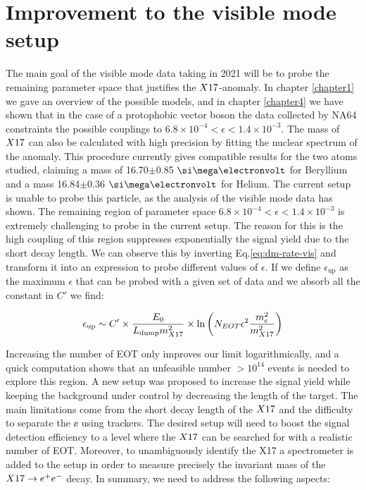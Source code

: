 \section{Improvement to the visible mode setup}
\label{ch5:sec:new-vismode-setup}

The main goal of the visible mode data taking in 2021 will be to probe the remaining parameter space that justifies the $X17$-anomaly. In chapter \ref{chapter1} we gave an overview of the possible models, and in chapter \ref{chapter4} we have shown that in the case of a protophobic vector boson the data collected by NA64 constraints the possible couplings to $6.8 \times 10^{-4} < \epsilon < 1.4 \times 10^{-3}$. The mass of $X17$ can also be calculated with high precision by fitting the nuclear spectrum of the anomaly. This procedure currently gives compatible results for the two atoms studied, claiming a mass of 16.70$\pm$0.85 $\mev$ for Beryllium and a mass 16.84$\pm$0.36 $\mev$ for Helium. The current setup is unable to probe this particle, as the analysis of the visible mode data has shown. The remaining region of parameter space $6.8 \times 10^{-4} < \epsilon < 1.4 \times 10^{-3}$ is extremely challenging to probe in the current setup. The reason for this is the high coupling of this region suppresses exponentially the signal yield due to the short decay length. We can observe this by inverting Eq.\ref{eq:dm-rate-vis} and transform it into an expression to probe different values of $\epsilon$. If we define $\epsilon_{\textrm{up}}$ as the maximum $\epsilon$ that can be probed with a given set of data and we absorb all the constant in $C'$ we find:

\begin{equation}
  \label{eq:x17-coverage}
  \epsilon_{\textrm{up}} \sim C' \times \frac{E_0}{L_{\textrm{dump}}m^2_{X17}} \times \ln{\left(N_{EOT} \epsilon^2 \frac{m_e^2}{m_{X17}^2}\right)}
\end{equation}

Increasing the number of EOT only improves our limit logarithmically, and a quick computation shows that an unfeasible number $>10^{14}$ events is needed to explore this region. A new setup was proposed to increase the signal yield while keeping the background under control by decreasing the length of the target. The main limitations come from the short decay length of the $X17$ and the difficulty to separate the $\ee$ using trackers. The desired setup will need to boost the signal detection efficiency to a level where the $X17$ can be searched for with a realistic number of EOT. Moreover, to unambiguously identify the X17 a spectrometer is added to the setup in order to measure precisely the invariant mass of the $X17 \rightarrow e^+ e^-$ decay. In summary, we need to address the following aspects:

